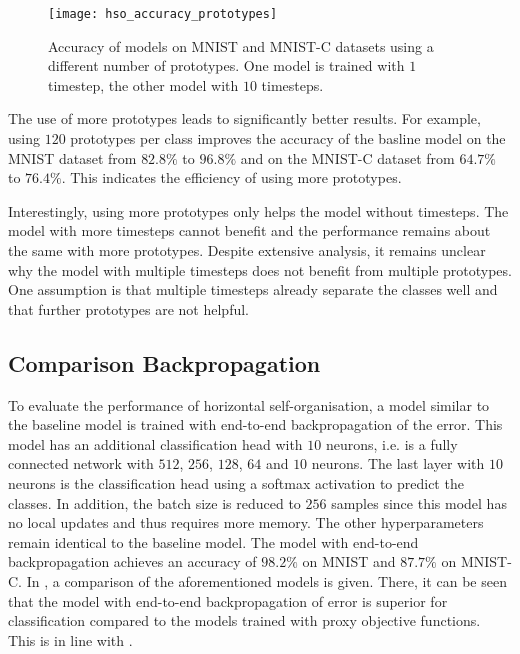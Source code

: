 \begin{figure}[h]
    \centering
    \texttt{[image: hso\_accuracy\_prototypes]}
    \caption[Accuracy of models with different number of prototypes]{Accuracy of models on MNIST and MNIST-C datasets using a different number of prototypes. One model is trained with $1$ timestep, the other model with $10$ timesteps.}
\end{figure}

The use of more prototypes leads to significantly better results. For example, using $120$ prototypes per class improves the accuracy of the basline model on the MNIST dataset from $82.8\%$ to $96.8\%$ and on the MNIST-C dataset from $64.7\%$ to $76.4\%$.
This indicates the efficiency of using more prototypes.

Interestingly, using more prototypes only helps the model without timesteps. The model with more timesteps cannot benefit and the performance remains about the same with more prototypes. Despite extensive analysis, it remains unclear why the model with multiple timesteps does not benefit from multiple prototypes. One assumption is that multiple timesteps already separate the classes well and that further prototypes are not helpful.


\subsection{Comparison Backpropagation}
To evaluate the performance of horizontal self-organisation, a model similar to the baseline model is trained with end-to-end backpropagation of the error. This model has an additional classification head with $10$ neurons, i.e. is a fully connected network with $512$, $256$, $128$, $64$ and $10$ neurons. The last layer with $10$ neurons is the classification head using a softmax activation to predict the classes. 
In addition, the batch size is reduced to $256$ samples since this model has no local updates and thus requires more memory. The other hyperparameters remain identical to the baseline model. The model with end-to-end backpropagation achieves an accuracy of $98.2\%$ on MNIST and $87.7\%$ on MNIST-C. In , a comparison of the aforementioned models is given. There, it can be seen that the model with end-to-end backpropagation of error is superior for classification compared to the models trained with proxy objective functions. This is in line with .



